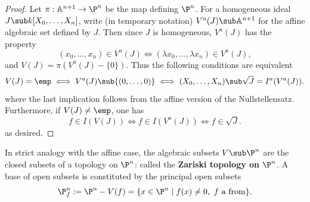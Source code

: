 \begin{proof}
Let $\pi:\mathbb{A}^{n+1}\to\P^n$ be the map defining $\P^n$. For a homogeneous ideal $J\sub k[X_0,\dots,X_n]$, write (in temporary notation) $V^a(J)\sub\mathbb{A}^{n+1}$ for the affine algebraic set defined by $J$. Then since $J$ is homogeneous, $V^a(J)$ has the property
\[(x_0,\dots,x_n)\in  V^a(J)\iff (\lambda x_0,\dots,\lambda x_{n})\in V^a(J),\]
and $V(J)=\pi(V^a(J)-\{0\})$. Thus the following conditions are equivalent
\[V(J)=\emp\iff V^a(J)\sub\{(0,\dots,0)\}\iff(X_0,\dots,X_n)\sub\sqrt{J}=I^a(V^a(J)).\]
where the last implication follows from the affine version of the Nullstellensatz. Furthermore, if $V(J)\neq\emp$, one has
\[f\in I(V(J))\iff f\in I(V^a(J))\iff f\in\sqrt{J}.\]
as desired.
\end{proof}
In strict analogy with the affine case, the algebraic subsets $V\sub\P^n$ are the closed subsets of a topology on $\P^n$: called the \textbf{Zariski topology on $\P^n$}. A base of open subsets is constituted by the principal open subsets
\[\P^n_f:=\P^n-V(f)=\{x\in\P^n\mid f(x)\neq 0,\text{ $f$ a from}\}.\]
